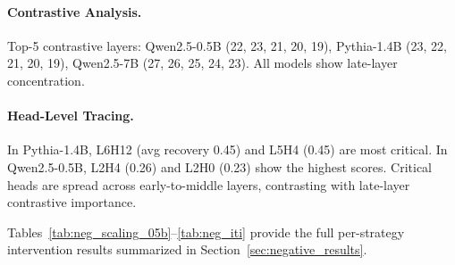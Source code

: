 \documentclass[11pt]{article}
\begin{document}
\paragraph{Contrastive Analysis.} Top-5 contrastive layers: Qwen2.5-0.5B (22, 23, 21, 20, 19), Pythia-1.4B (23, 22, 21, 20, 19), Qwen2.5-7B (27, 26, 25, 24, 23). All models show late-layer concentration.

\paragraph{Head-Level Tracing.} In Pythia-1.4B, L6H12 (avg recovery 0.45) and L5H4 (0.45) are most critical. In Qwen2.5-0.5B, L2H4 (0.26) and L2H0 (0.23) show the highest scores. Critical heads are spread across early-to-middle layers, contrasting with late-layer contrastive importance.

Tables~\ref{tab:neg_scaling_05b}--\ref{tab:neg_iti} provide the full per-strategy intervention results summarized in Section~\ref{sec:negative_results}.

\begin{table}[htbp]
\centering
\small
{}
\caption{Representative activation scaling results on Chinese benchmark (Qwen2.5-0.5B, 100 samples). Only 2 of 20 strategies show positive effect ($\leq$2\%).}
\label{tab:neg_scaling_05b}
\end{table}

\begin{table}[htbp]
\centering
\small
{}
\caption{Activation scaling on Qwen2.5-7B. Best strategy achieves only +1\%; late residual suppression causes catastrophic degradation.}
\label{tab:neg_scaling_7b}
\end{table}
\end{document}

